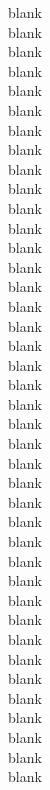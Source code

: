 \documentclass{article}
\begin{document}
\begin{multicols}{3}
blank\\
blank\\
blank\\
blank\\
blank\\
blank\\
blank\\
blank\\
blank\\
blank\\
blank\\
blank\\
blank\\
blank\\
blank\\
blank\\
blank\\
blank\\
blank\\
blank\\
blank\\
blank\\
blank\\
blank\\
blank\\
blank\\
blank\\
blank\\
blank\\
blank\\
blank\\
blank\\
blank\\
blank\\
blank\\
blank\\
blank\\
blank\\
blank\\
blank\\

\end{multicols}
 
\end{document}

